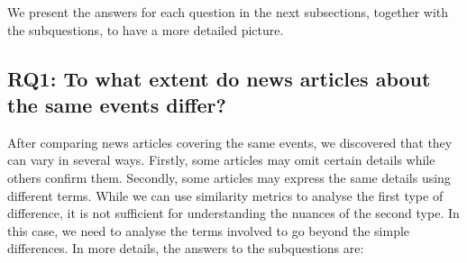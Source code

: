 We present the answers for each question in the next subsections, together with the subquestions, to have a more detailed picture.


\subsection*{RQ1: To what extent do news articles about the same events differ?}

After comparing news articles covering the same events, we discovered that they can vary in several ways. Firstly, some articles may omit certain details while others confirm them. Secondly, some articles may express the same details using different terms. While we can use similarity metrics to analyse the first type of difference, it is not sufficient for understanding the nuances of the second type. In this case, we need to analyse the terms involved to go beyond the simple differences.
In more details, the answers to the subquestions are:

